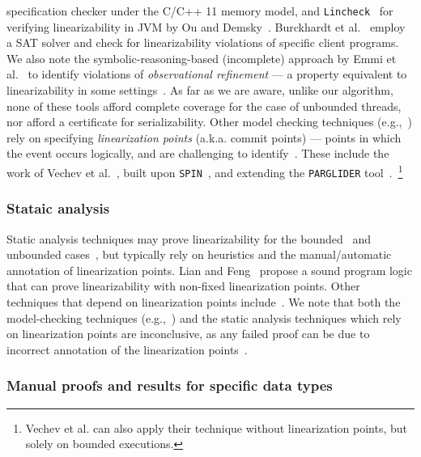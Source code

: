 specification checker under the C/C++ 11 memory model, and 
\texttt{Lincheck}~\cite{KoDeSoTsAl23} for verifying linearizability in JVM by 
Ou and 
Demsky~\cite{OuDe17}. 
%
Burckhardt et al.~\cite{BuAlMa07} employ a SAT solver and check for 
linearizability violations of specific client programs.
%
We also note the symbolic-reasoning-based (incomplete) approach by Emmi et 
al.~\cite{EmEnHa15} to identify violations of \textit{observational refinement} 
--- a property equivalent to linearizability in some settings~\cite{FiOhRiYa10, 
	BoEmCoHa15}.
%
As far as we are aware, unlike our algorithm, none of these tools afford 
complete coverage for the case of unbounded threads, nor afford a certificate for serializability.
%
Other model checking techniques (e.g.,~\cite{Fl04}) rely on specifying 
\textit{linearization points} (a.k.a. commit points) --- points in which the 
event occurs logically, and are challenging to identify~\cite{VeYaYo09}.
%
These include the work of Vechev et al.~\cite{VeYaYo09}, built upon 
\texttt{SPIN}~\cite{Ho97}, and extending the \texttt{PARGLIDER} 
tool~\cite{VeYa08}.~\footnote{Vechev et al. can also apply their 
technique without linearization points, but solely on bounded executions.}



\subsubsection{Stataic analysis}

Static analysis techniques may prove linearizability for the 
bounded~\cite{AmRiReSaYa07, BeLeMaRaSa08, MaLeSaRaBe08} and unbounded 
cases~\cite{BeLeMaRaSa08, Va09, 
	Va10}, but typically rely on heuristics and the manual/automatic annotation 
	of 
linearization points. 
%
Lian and Feng~\cite{LiFe13} propose a sound program logic that can prove 
linearizability with non-fixed linearization points.
%
Other techniques that depend on linearization points 
include~\cite{OhRiVeYaYo10, ZhPeHa15, AbJoTr16}. 
%
%
We note that both the model-checking techniques (e.g.,~\cite{CeRaZuChAl10}) and 
the static analysis techniques which rely on linearization points are 
inconclusive, as any failed proof can be due to incorrect annotation of the 
linearization points~\cite{BoEmCoHa15}.
%


\subsubsection{Manual proofs and results for specific data types}

